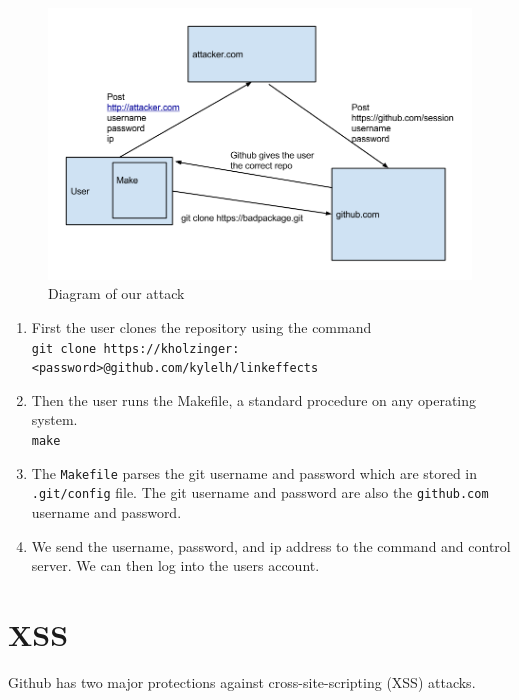 \documentclass{lposter}
\theoremstyle{plain}
\theoremstyle{definition}
\renewcommand{\tt}[1]{\texttt{#1}}
\begin{document}
\begin{poster}
\begin{figure}
\centering
\includegraphics[scale=.7]{attack.png}
\caption{Diagram of our attack\newline}
\label{fig:mig_over}
\end{figure}

\begin{enumerate}
\item First the user clones the repository using the command\\ \tt{git clone https://kholzinger:<password>@github.com/kylelh/linkeffects}
\item Then the user runs the Makefile, a standard procedure on any operating system.\\
\tt{make}

\item The \tt{Makefile} parses the git username and password which are stored in \tt{.git/config} file. The git username and password are also the \tt{github.com} username and password.
\item We send the username, password, and ip address to the command and control server. We can then log into the users account.


\end{enumerate}

\section{XSS}

Github has two major protections against cross-site-scripting (XSS) attacks. 







\end{poster}
\end{document}

